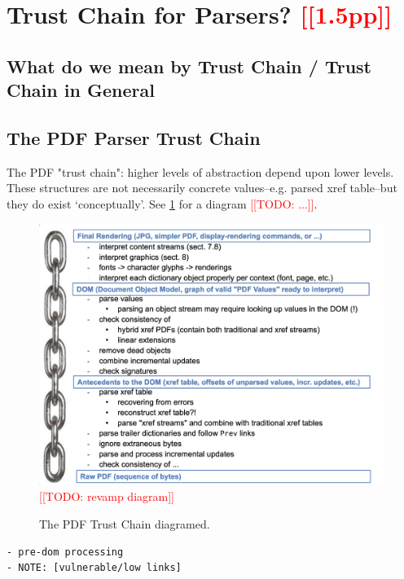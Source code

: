 \documentclass[conference,12pt]{IEEEtran}
\newcommand{\note}[1]{\noteYes{#1}}
\newcommand{\noteYes}[1]{\textcolor{red}{[[#1]]}}
\newcommand{\todo}[1]{\note{TODO: #1}}
\begin{document}
\section{Trust Chain for Parsers? \note{1.5pp}}
\label{sec:trustchain}

\subsection{What do we mean by Trust Chain / Trust Chain in General}

\subsection{The PDF Parser Trust Chain}

The PDF "trust chain": higher levels of abstraction depend upon lower levels.
These structures are not necessarily concrete values--e.g. parsed xref table--but they do exist `conceptually'.
See \cref{fig:pdf-trust-chain} for a diagram \todo{...}.

\begin{figure}[t]
    \centering
    \includegraphics[width=\linewidth]{figures/trustchain-diagram.png}
    \todo{revamp diagram}
    \caption{The PDF Trust Chain diagramed.}
    \label{fig:pdf-trust-chain}
\end{figure}


\begin{lstlisting}[style=meta]
- pre-dom processing
- NOTE: [vulnerable/low links]
\end{lstlisting}
\end{document}
